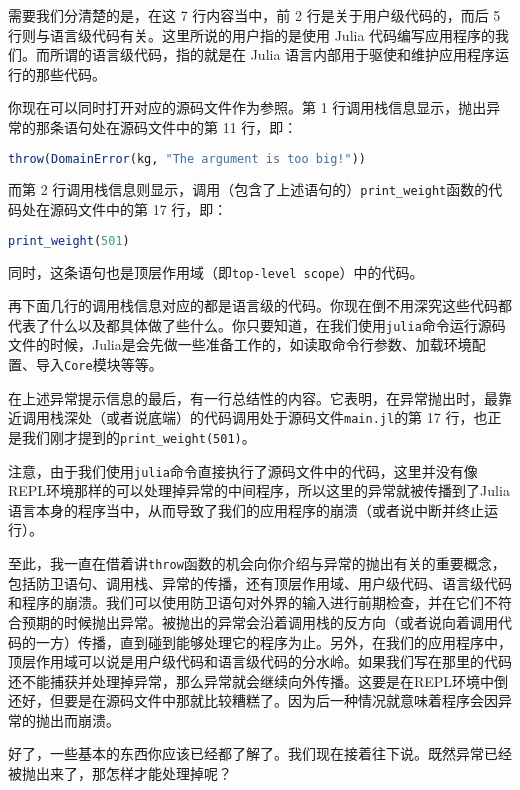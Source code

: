 需要我们分清楚的是，在这 7 行内容当中，前 2 行是关于用户级代码的，而后 5 行则与语言级代码有关。这里所说的用户指的是使用 Julia 代码编写应用程序的我们。而所谓的语言级代码，指的就是在 Julia 语言内部用于驱使和维护应用程序运行的那些代码。

你现在可以同时打开对应的源码文件作为参照。第 1 行调用栈信息显示，抛出异常的那条语句处在源码文件中的第 11 行，即：

\begin{lstlisting}[language=julia]
throw(DomainError(kg, "The argument is too big!"))
\end{lstlisting}

而第 2 行调用栈信息则显示，调用（包含了上述语句的）\verb|print_weight|函数的代码处在源码文件中的第 17 行，即：

\begin{lstlisting}[language=julia]
print_weight(501)
\end{lstlisting}

同时，这条语句也是顶层作用域（即\verb|top-level scope|）中的代码。

再下面几行的调用栈信息对应的都是语言级的代码。你现在倒不用深究这些代码都代表了什么以及都具体做了些什么。你只要知道，在我们使用\verb|julia|命令运行源码文件的时候，Julia是会先做一些准备工作的，如读取命令行参数、加载环境配置、导入\verb|Core|模块等等。 

在上述异常提示信息的最后，有一行总结性的内容。它表明，在异常抛出时，最靠近调用栈深处（或者说底端）的代码调用处于源码文件\verb|main.jl|的第 17 行，也正是我们刚才提到的\verb|print_weight(501)|。

注意，由于我们使用\verb|julia|命令直接执行了源码文件中的代码，这里并没有像REPL环境那样的可以处理掉异常的中间程序，所以这里的异常就被传播到了Julia语言本身的程序当中，从而导致了我们的应用程序的崩溃（或者说中断并终止运行）。

至此，我一直在借着讲\verb|throw|函数的机会向你介绍与异常的抛出有关的重要概念，包括防卫语句、调用栈、异常的传播，还有顶层作用域、用户级代码、语言级代码和程序的崩溃。我们可以使用防卫语句对外界的输入进行前期检查，并在它们不符合预期的时候抛出异常。被抛出的异常会沿着调用栈的反方向（或者说向着调用代码的一方）传播，直到碰到能够处理它的程序为止。另外，在我们的应用程序中，顶层作用域可以说是用户级代码和语言级代码的分水岭。如果我们写在那里的代码还不能捕获并处理掉异常，那么异常就会继续向外传播。这要是在REPL环境中倒还好，但要是在源码文件中那就比较糟糕了。因为后一种情况就意味着程序会因异常的抛出而崩溃。

好了，一些基本的东西你应该已经都了解了。我们现在接着往下说。既然异常已经被抛出来了，那怎样才能处理掉呢？

